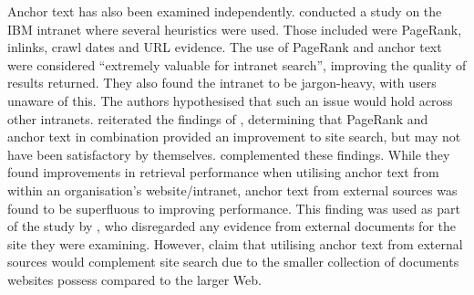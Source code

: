Anchor text has also been examined independently. \citeauthor{fagin2003searching_workplace_web} \cite{fagin2003searching_workplace_web} conducted a study on the IBM intranet where several heuristics were used. Those included were PageRank, inlinks, crawl dates and URL evidence. The use of PageRank and anchor text were considered ``extremely valuable for intranet search'', improving the quality of results returned. They also found the intranet to be jargon-heavy, with users unaware of this. The authors hypothesised that such an issue would hold across other intranets. \citeauthor{upstill2003queryindependent_evidence} \cite{upstill2003queryindependent_evidence} reiterated the findings of \citeauthor{fagin2003searching_workplace_web} \cite{fagin2003searching_workplace_web}, determining that PageRank and anchor text in combination provided an improvement to site search, but may not have been satisfactory by themselves. \citeauthor{hawking2004link_site_search} \cite{hawking2004link_site_search} complemented these findings. While they found improvements in retrieval performance when utilising anchor text from within an organisation's website/intranet, anchor text from external sources was found to be superfluous to improving performance. This finding was used as part of the study by \citeauthor{ding2007log_based_site_search} \cite{ding2007log_based_site_search}, who disregarded any evidence from external documents for the site they were examining. However, \citeauthor{upstill2003queryindependent_evidence} \cite{upstill2003queryindependent_evidence} claim that utilising anchor text from external sources would complement site search due to the smaller collection of documents websites possess compared to the larger Web.

